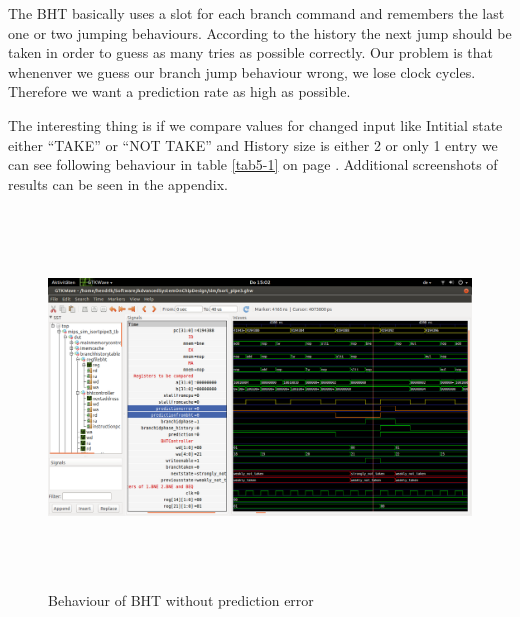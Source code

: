 The BHT basically uses a slot for each branch command and remembers the last one or two jumping behaviours. According to the history the next jump should be taken in order to guess as many tries as possible correctly. Our problem is that whenenver we guess our branch jump behaviour wrong, we lose clock cycles. Therefore we want a prediction rate as high as possible. 

The interesting thing is if we compare values for changed input like Intitial state either ``TAKE'' or ``NOT TAKE'' and History size is either 2 or only 1 entry we can see following behaviour in table \ref{tab5-1} on page \pageref{tab5-1}. Additional screenshots of results can be seen in the appendix.

\begin{table}[h]
\end{table}


\begin{figure}
	\centering
	\includegraphics[width=1\textwidth, height=10cm, keepaspectratio]{pictures/BHT_BranchNotTakenPred0Err0}
	\caption{Behaviour of BHT without prediction error}
	\label{fig5-1}
\end{figure}

